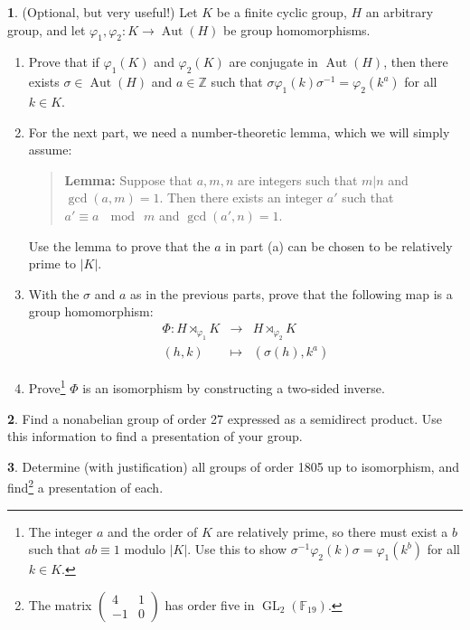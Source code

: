 \documentclass[12pt]{article}
\newcommand{\GL}{\operatorname{GL}}
\newcommand{\Aut}{\operatorname{Aut}}
\theoremstyle{definition}
\newtheorem{ex}{}
\begin{document}
\begin{ex}
	(Optional, but very useful!) Let $K$ be a finite cyclic group, $H$ an arbitrary group,
	and let $\varphi_1,\varphi_2 : K \to \Aut(H)$ be group homomorphisms.

	\begin{enumerate}
		\item Prove that if $\varphi_1(K)$ and $\varphi_2(K)$ are conjugate in $\Aut(H)$, then there exists $\sigma \in \Aut(H)$ and $a \in \mathbb{Z}$ such that
		      $\sigma\varphi_1(k)\sigma^{-1} = \varphi_2(k^a)$ for all $k \in K$.
		\item For the next part, we need a number-theoretic lemma, which we will simply assume:
		      \begin{quote}
			      \textbf{Lemma:} Suppose that $a,m,n$ are integers such that $m | n$ and $\gcd(a,m) = 1$.
			      Then there exists an integer $a'$ such that $a' \equiv a~\mod~m$ and $\gcd(a',n) = 1$.
		      \end{quote}
		      Use the lemma to prove that the $a$ in part (a) can be chosen to be relatively prime to $|K|$.
		\item With the $\sigma$ and $a$ as in the previous parts, prove that the following map
		      is a group homomorphism:
		      \begin{eqnarray*}
			      \Phi : H \rtimes_{\varphi_1} K & \to & H \rtimes_{\varphi_2} K \\
			      (h,k) & \mapsto & (\sigma(h), k^a)
		      \end{eqnarray*}
		\item Prove\footnote{The integer $a$ and the order of $K$ are relatively prime, so
			      there must exist a $b$ such that $ab \equiv 1$ modulo $|K|$.  Use this to show
			      $\sigma^{-1}\varphi_2(k)\sigma = \varphi_1(k^b)$ for all $k \in K$.} $\Phi$ is an
		      isomorphism by constructing a two-sided inverse.
	\end{enumerate}
\end{ex}

\begin{ex}
	Find a nonabelian group of order 27 expressed as a semidirect product.
	Use this information to find a presentation of your group.
\end{ex}

\begin{ex}
	Determine (with justification) all groups of order 1805 up to isomorphism,
	and find\footnote{The matrix $\begin{pmatrix}4&1 \\ -1&0\end{pmatrix}$ has order
		five in $\GL_2(\mathbb{F}_{19})$.} a presentation of each.
\end{ex}
\end{document}
